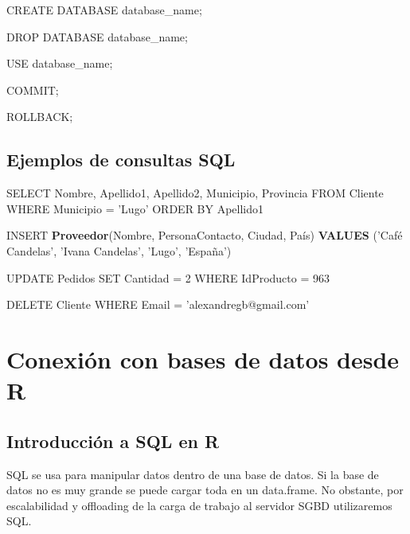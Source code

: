 \documentclass[]{book}
\newenvironment{Shaded}{\begin{snugshade}}{\end{snugshade}}
\newcommand{\KeywordTok}[1]{\textcolor[rgb]{0.13,0.29,0.53}{\textbf{#1}}}
\newcommand{\DecValTok}[1]{\textcolor[rgb]{0.00,0.00,0.81}{#1}}
\newcommand{\StringTok}[1]{\textcolor[rgb]{0.31,0.60,0.02}{#1}}
\newcommand{\NormalTok}[1]{#1}
\begin{document}
\begin{Shaded}
\begin{Highlighting}[]
\NormalTok{CREATE DATABASE database_name;}

\NormalTok{DROP DATABASE database_name;}

\NormalTok{USE database_name;}

\NormalTok{COMMIT;}

\NormalTok{ROLLBACK;}
\end{Highlighting}
\end{Shaded}

\subsection{Ejemplos de consultas SQL}\label{ejemplos-de-consultas-sql}

\begin{Shaded}
\begin{Highlighting}[]
\NormalTok{SELECT Nombre, Apellido1, Apellido2, Municipio, Provincia }
\NormalTok{FROM Cliente}
\NormalTok{WHERE Municipio =}\StringTok{ 'Lugo'}
\NormalTok{ORDER BY Apellido1}

\NormalTok{INSERT }\KeywordTok{Proveedor}\NormalTok{(Nombre, PersonaContacto, Ciudad, País)}
\KeywordTok{VALUES}\NormalTok{ (}\StringTok{'Café Candelas'}\NormalTok{, }\StringTok{'Ivana Candelas'}\NormalTok{, }\StringTok{'Lugo'}\NormalTok{, }\StringTok{'España'}\NormalTok{)}

\NormalTok{UPDATE Pedidos}
\NormalTok{SET Cantidad =}\StringTok{ }\DecValTok{2}
\NormalTok{WHERE IdProducto =}\StringTok{ }\DecValTok{963}

\NormalTok{DELETE Cliente}
\NormalTok{WHERE Email =}\StringTok{ 'alexandregb@gmail.com'}
\end{Highlighting}
\end{Shaded}

\section{Conexión con bases de datos desde
R}\label{conexion-con-bases-de-datos-desde-r}

\subsection{Introducción a SQL en R}\label{introduccion-a-sql-en-r}

SQL se usa para manipular datos dentro de una base de datos. Si la base
de datos no es muy grande se puede cargar toda en un data.frame. No
obstante, por escalabilidad y offloading de la carga de trabajo al
servidor SGBD utilizaremos SQL.
\end{document}
